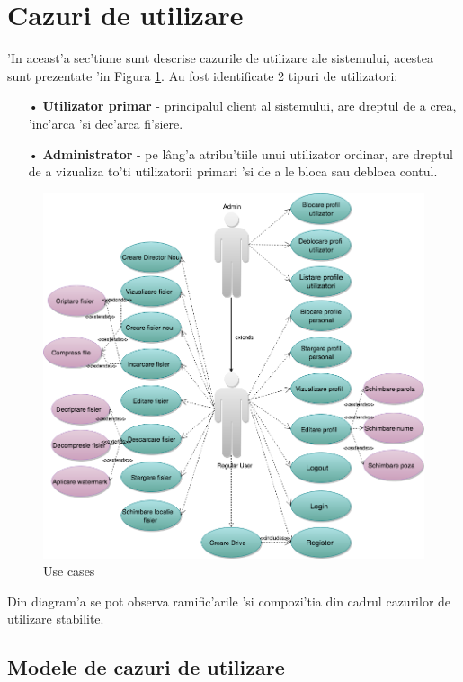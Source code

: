 \documentclass[12pt,a4paper,twoside]{report}
\begin{document}
\section{Cazuri de utilizare}
'In aceast'a sec'tiune sunt descrise cazurile de utilizare ale sistemului, acestea sunt prezentate 'in Figura \ref{use_cases_diagram}. Au fost identificate 2 tipuri de utilizatori:
\begin{itemize}
\item[•] \textbf{Utilizator primar} - principalul client al sistemului, are dreptul de a crea, 'inc'arca 'si dec'arca fi'siere.
\item[•] \textbf{Administrator} - pe lâng'a atribu'tiile unui utilizator ordinar, are dreptul de a vizualiza to'ti utilizatorii primari 'si de a le bloca sau debloca contul.
\end{itemize}
\begin{figure}[H]
\begin{center}
\advance\leftskip-3cm
\advance\rightskip-3cm
\includegraphics[keepaspectratio=true,scale=0.55]{img/use_case_diagram.png}
\caption{Use cases}
\label{use_cases_diagram}
\end{center}
\end{figure}
Din diagram'a se pot observa ramific'arile 'si compozi'tia din cadrul cazurilor de utilizare stabilite.
\subsection{Modele de cazuri de utilizare}
\end{document}
